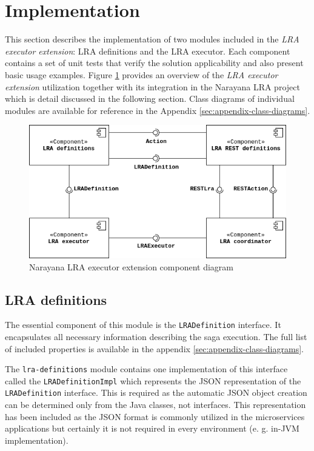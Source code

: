\documentclass[oneside,
  digital, %
  table,   %
  lof,     %
  lot,     %
]{fithesis3}
\begin{document}
\section{Implementation}

This section describes the implementation of two modules included in the \textit{LRA executor extension}: LRA definitions and the LRA executor. Each component contains a set of unit tests that verify the solution applicability and also present basic usage examples. Figure \ref{fig:integration-component} provides an overview of the \textit{LRA executor extension} utilization together with its integration in the Narayana LRA project which is detail discussed in the following section. Class diagrams of individual modules are available for reference in the Appendix \ref{sec:appendix-class-diagrams}.

\hfill \break

\begin{figure}[h]
    \begin{center}
        \includegraphics[width=1.0\textwidth]{images/componentDiagrams/narayana-integration-component.png}
    \end{center}
    \caption{Narayana LRA executor extension component diagram}
    \label{fig:integration-component}
\end{figure}


\subsection{LRA definitions}

The essential component of this module is the \texttt{LRADefinition} interface. It encapsulates all necessary information describing the saga execution. The full list of included properties is available in the appendix \ref{sec:appendix-class-diagrams}. 

The \texttt{lra-definitions} module contains one implementation of this interface called the \texttt{LRADefinitionImpl} which represents the JSON representation of the \texttt{LRADefinition} interface. This is required as the automatic JSON object creation can be determined only from the Java classes, not interfaces. This representation has been included as the JSON format is commonly utilized in the microservices applications but certainly it is not required in every environment (e. g. in-JVM implementation).
\end{document}
